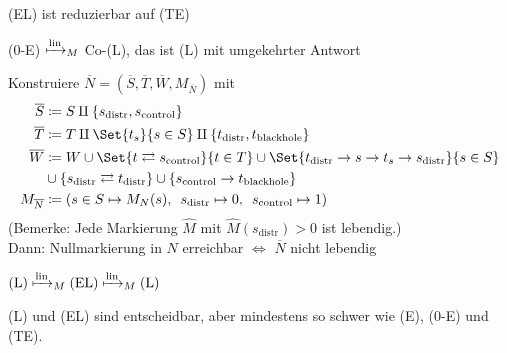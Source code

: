 \documentclass{cheat-sheet}
\newcommand{\reducesManyOneToLin}{\xmapsto{\mathrm{lin}}_M} %
\begin{document}
\begin{satz}
  (EL) ist reduzierbar auf (TE)
\end{satz}


\begin{satz}
  (0-E) $\reducesManyOneToLin$ Co-(L), das ist (L) mit umgekehrter Antwort
\end{satz}

\begin{beweis}
  Konstruiere $\overline{N} = (\overline{S}, \overline{T}, \overline{W}, M_{\overline{N}})$ mit
  \begin{align*}
    \overline{S} & \coloneqq S \amalg \{ s_\mathrm{distr}, s_\mathrm{control} \} \\
    \overline{T} & \coloneqq T \amalg \Set{t_s}{s \in S} \amalg \{ t_\mathrm{distr}, t_\mathrm{blackhole} \} \\
    \overline{W} & \coloneqq W \cup \Set{t \rightleftarrows s_\mathrm{control}}{t \in T} \cup \Set{t_\mathrm{distr} \to s \to t_s \to s_\mathrm{distr}}{s \in S} \\
    & \cup \{ s_\mathrm{distr} \rightleftarrows t_\mathrm{distr} \} \cup \{ s_\mathrm{control} \to t_\mathrm{blackhole} \} \\
    M_{\overline{N}} & \coloneqq (s \in S \mapsto M_N(s), \enspace s_\mathrm{distr} \mapsto 0, \enspace s_\mathrm{control} \mapsto 1)
  \end{align*}
  (Bemerke: Jede Markierung $\hat{M}$ mit $\hat{M}(s_\mathrm{distr}) > 0$ ist lebendig.) \\
  Dann: Nullmarkierung in $N$ erreichbar $\iff$ $\overline{N}$ nicht lebendig
\end{beweis}

\begin{satz}
  $\text{(L)} \reducesManyOneToLin \text{(EL)} \reducesManyOneToLin \text{(L)}$
\end{satz}


\begin{fazit}
  (L) und (EL) sind entscheidbar, aber mindestens so schwer wie (E), (0-E) und (TE).
\end{fazit}
\end{document}
